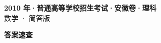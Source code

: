 \documentclass[zihao=-4, a4paper]{ctexart}
\begin{document}
\begin{center}
  {\Large\bfseries 2010 年·普通高等学校招生考试·安徽卷·理科}\\[4pt]
  {\large 数学 · 简答版}
\end{center}
\medskip
{}

\clearpage
{}
\begin{center}{\Large\bfseries 答案速查}\end{center}
\medskip

\end{document}
